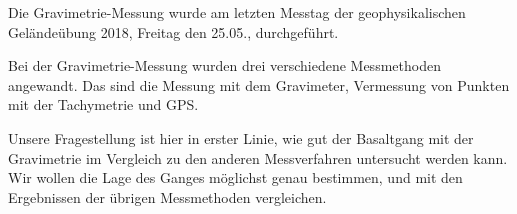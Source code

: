 Die Gravimetrie-Messung wurde am letzten Messtag der geophysikalischen Geländeübung 2018, Freitag den 25.05., durchgeführt. 

Bei der Gravimetrie-Messung wurden drei verschiedene Messmethoden angewandt. Das sind die Messung mit dem Gravimeter, Vermessung von Punkten mit der Tachymetrie und GPS.

Unsere Fragestellung ist hier in erster Linie, wie gut der Basaltgang mit der Gravimetrie im Vergleich zu den anderen Messverfahren untersucht werden kann.  Wir wollen die Lage des Ganges möglichst genau bestimmen, und mit den  Ergebnissen der übrigen Messmethoden vergleichen.